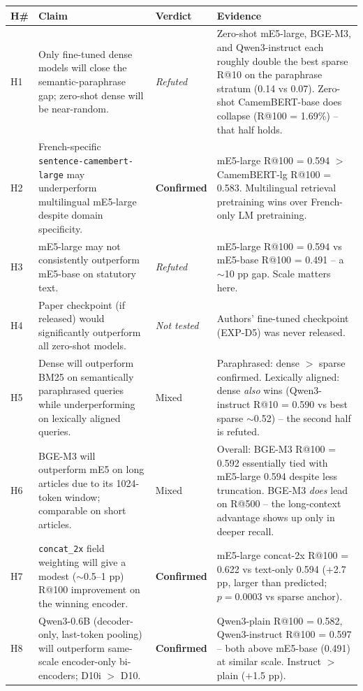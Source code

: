 \begin{tabularx}{\linewidth}{@{}l X l X@{}}
\toprule
H\# & {Claim} & {Verdict} & {Evidence} \\
\midrule
H1 & Only fine-tuned dense models will close the semantic-paraphrase gap; zero-shot dense will be near-random. & \textit{Refuted} & Zero-shot mE5-large, BGE-M3, and Qwen3-instruct each roughly double the best sparse R@10 on the paraphrase stratum (0.14 vs 0.07). Zero-shot CamemBERT-base does collapse (R@100 = 1.69\%) -- that half holds. \\
H2 & French-specific \texttt{sentence-camembert-large} may underperform multilingual mE5-large despite domain specificity. & \textbf{Confirmed} & mE5-large R@100 = 0.594 $>$ CamemBERT-lg R@100 = 0.583. Multilingual retrieval pretraining wins over French-only LM pretraining. \\
H3 & mE5-large may not consistently outperform mE5-base on statutory text. & \textit{Refuted} & mE5-large R@100 = 0.594 vs mE5-base R@100 = 0.491 -- a $\sim$10 pp gap. Scale matters here. \\
H4 & Paper checkpoint (if released) would significantly outperform all zero-shot models. & \textit{Not tested} & Authors' fine-tuned checkpoint (EXP-D5) was never released. \\
H5 & Dense will outperform BM25 on semantically paraphrased queries while underperforming on lexically aligned queries. & Mixed & Paraphrased: dense $>$ sparse confirmed. Lexically aligned: dense \emph{also} wins (Qwen3-instruct R@10 = 0.590 vs best sparse $\sim$0.52) -- the second half is refuted. \\
H6 & BGE-M3 will outperform mE5 on long articles due to its 1024-token window; comparable on short articles. & Mixed & Overall: BGE-M3 R@100 = 0.592 essentially tied with mE5-large 0.594 despite less truncation. BGE-M3 \emph{does} lead on R@500 -- the long-context advantage shows up only in deeper recall. \\
H7 & \texttt{concat\_2x} field weighting will give a modest ($\sim$0.5--1 pp) R@100 improvement on the winning encoder. & \textbf{Confirmed} & mE5-large concat-2x R@100 = 0.622 vs text-only 0.594 ($+$2.7 pp, larger than predicted; $p = 0.0003$ vs sparse anchor). \\
H8 & Qwen3-0.6B (decoder-only, last-token pooling) will outperform same-scale encoder-only bi-encoders; D10i $>$ D10. & \textbf{Confirmed} & Qwen3-plain R@100 = 0.582, Qwen3-instruct R@100 = 0.597 -- both above mE5-base (0.491) at similar scale. Instruct $>$ plain ($+$1.5 pp). \\
\bottomrule
\end{tabularx}
